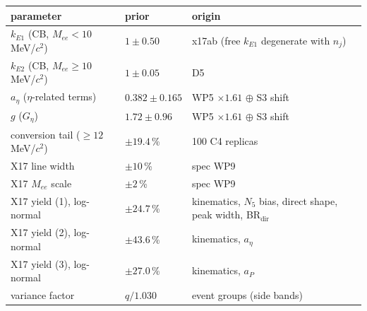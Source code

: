 \begin{tabular}{l l l}
\toprule
parameter & prior & origin \\
\midrule
$k_{E1}$ (CB, $M_{ee}<10$ MeV/$c^2$) & $1\pm0.50$ & x17ab (free $k_{E1}$ degenerate with $n_j$) \\
$k_{E2}$ (CB, $M_{ee}\ge10$ MeV/$c^2$) & $1\pm0.05$ & D5 \\
$a_\eta$ ($\eta$-related terms) & $0.382\pm0.165$ & WP5 $\times1.61$ $\oplus$ S3 shift \\
$g$ ($G_\eta$) & $1.72\pm0.96$ & WP5 $\times1.61$ $\oplus$ S3 shift \\
conversion tail ($\ge12$ MeV/$c^2$) & $\pm19.4$\,\% & 100 C4 replicas \\
X17 line width & $\pm10$\,\% & spec WP9 \\
X17 $M_{ee}$ scale & $\pm2$\,\% & spec WP9 \\
X17 yield (1), log-normal & $\pm24.7$\,\% & kinematics, $N_5$ bias, direct shape, peak width, BR$_\mathrm{dir}$ \\
X17 yield (2), log-normal & $\pm43.6$\,\% & kinematics, $a_\eta$ \\
X17 yield (3), log-normal & $\pm27.0$\,\% & kinematics, $a_P$ \\
variance factor & $q/1.030$ & event groups (side bands) \\
\bottomrule
\end{tabular}
